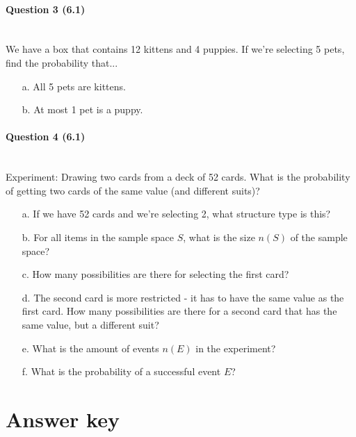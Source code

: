 \documentclass[a4paper,12pt]{book}
\begin{document}
        \paragraph{Question 3 (6.1)} ~\\
            We have a box that contains 12 kittens and 4 puppies.
            If we're selecting 5 pets, find the probability that...
            \begin{enumerate}
                \item[a.] All 5 pets are kittens.
                \item[b.] At most 1 pet is a puppy.
            \end{enumerate}

        \paragraph{Question 4 (6.1)} ~\\
            Experiment: Drawing two cards from a deck of 52 cards.
                What is the probability of getting two cards of the same value (and different suits)?
            \begin{enumerate}
                \item[a.] If we have 52 cards and we're selecting 2, what
                    structure type is this?
                \item[b.] For all items in the sample space $S$, what is the size $n(S)$ of the sample space?
                \item[c.] How many possibilities are there for selecting the first card?
                \item[d.] The second card is more restricted - it has to have the same
                    value as the first card. How many possibilities are there for a
                    second card that has the same value, but a different suit?
                \item[e.] What is the amount of events $n(E)$ in the experiment?
                \item[f.] What is the probability of a successful event $E$?
            \end{enumerate}

        \newpage

        \newpage
        \section*{Answer key}
        
\end{document}
